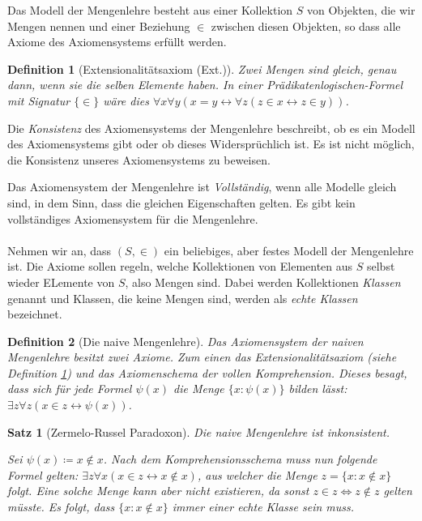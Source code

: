 \documentclass[german]{article}
\theoremstyle{break}
\theoremstyle{def_style}
\newtheorem{definition}{Definition}
\theoremstyle{def_style}
\newtheorem{satz}{Satz}
\begin{document}
Das Modell der Mengenlehre besteht aus einer Kollektion $S$ von Objekten, die wir Mengen nennen und einer Beziehung $\in$ zwischen diesen Objekten, so dass alle Axiome des Axiomensystems erfüllt werden.

\begin{definition}[Extensionalitätsaxiom (Ext.)]
	Zwei Mengen sind gleich, genau dann, wenn sie die selben Elemente haben. In einer Prädikatenlogischen-Formel mit Signatur $\{\in\}$ wäre dies $\forall x \forall y (x=y \leftrightarrow \forall z (z \in x \leftrightarrow z \in y))$.
	\label{ExtAxiom}
\end{definition}

Die \textit{Konsistenz} des Axiomensystems der Mengenlehre beschreibt, ob es ein Modell des Axiomensystems gibt oder ob dieses Widersprüchlich ist. Es ist nicht möglich, die Konsistenz unseres Axiomensystems zu beweisen.

Das Axiomensystem der Mengenlehre ist \textit{Vollständig}, wenn alle Modelle \glqq gleich \grqq{} sind, in dem Sinn, dass die gleichen Eigenschaften gelten. Es gibt kein vollständiges Axiomensystem für die Mengenlehre.
\\
\\
Nehmen wir an, dass $(S,\in)$ ein beliebiges, aber festes Modell der Mengenlehre ist. Die Axiome sollen regeln, welche Kollektionen von Elementen aus $S$ selbst wieder ELemente von $S$, also Mengen sind. Dabei werden Kollektionen \textit{Klassen} genannt und Klassen, die keine Mengen sind, werden als \textit{echte Klassen} bezeichnet.

\begin{definition}[Die naive Mengenlehre]
	Das Axiomensystem der naiven Mengenlehre besitzt zwei Axiome. Zum einen das Extensionalitätsaxiom (siehe Definition \ref{ExtAxiom}) und das Axiomenschema der vollen Komprehension. Dieses besagt, dass sich für jede Formel $\psi(x)$ die Menge $\{x : \psi(x)\}$ bilden lässt: $\exists z \forall z(x \in z \leftrightarrow \psi(x))$.
\end{definition}

\begin{satz}[Zermelo-Russel Paradoxon]
	Die naive Mengenlehre ist inkonsistent.
	
	Sei $\psi(x)\coloneqq x\notin x$. Nach dem Komprehensionsschema muss nun folgende Formel gelten: $\exists z \forall x(x\in z \leftrightarrow x\notin x)$, aus welcher die Menge $z=\{x : x\notin x\}$ folgt. Eine solche Menge kann aber nicht existieren, da sonst $z\in z \Leftrightarrow z \notin z$ gelten müsste. Es folgt, dass $\{x:x\notin x\}$ immer einer echte Klasse sein muss.
\end{satz}
\end{document}
